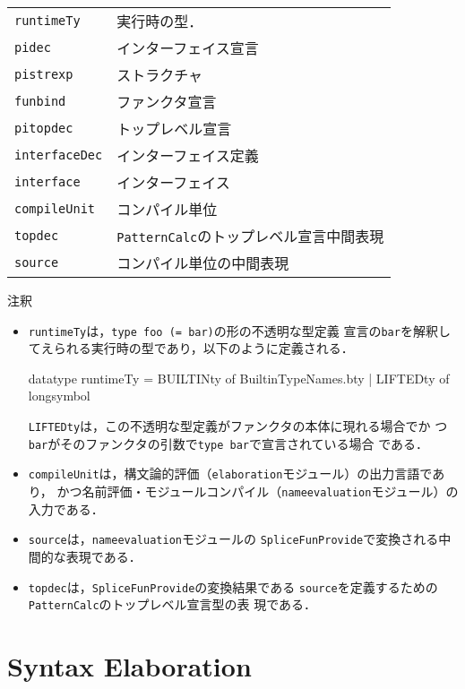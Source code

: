 \documentclass{jbook}
\newcommand{\txt}[2]{#2}
\newcommand{\code}[1]{\mbox{\large\tt #1}}
\newenvironment{programPlain}{\begin{large}\begin{tt}}%
	                     {\end{tt}\end{large}}
\begin{document}
\begin{tabular}{ll}
\code{runtimeTy} & 実行時の型．
\\
\code{pidec} & インターフェイス宣言
\\
\code{pistrexp} & ストラクチャ
\\
\code{funbind} & ファンクタ宣言
\\
\code{pitopdec} & トップレベル宣言
\\
\code{interfaceDec} & インターフェイス定義
\\
\code{interface} & インターフェイス
\\
\code{compileUnit} & コンパイル単位
\\
\code{topdec} & \code{PatternCalc}のトップレベル宣言中間表現
\\
\code{source} & コンパイル単位の中間表現
\end{tabular}

注釈
\begin{itemize}
\item \code{runtimeTy}は，\code{type foo (= bar)}の形の不透明な型定義
宣言の\code{bar}を解釈してえられる実行時の型であり，以下のように定義される．
\begin{programPlain}
datatype runtimeTy = BUILTINty of BuiltinTypeNames.bty | LIFTEDty of longsymbol
\end{programPlain}
\code{LIFTEDty}は，この不透明な型定義がファンクタの本体に現れる場合でか
つ\code{bar}がそのファンクタの引数で\code{type bar}で宣言されている場合
である．

\item \code{compileUnit}は，構文論的評価（\code{elaboration}モジュール）の出力言語であり，
かつ名前評価・モジュールコンパイル（\code{nameevaluation}モジュール）の
入力である．

\item 
	\code{source}は，\code{nameevaluation}モジュールの
\code{SpliceFunProvide}で変換される中間的な表現である．
\item \code{topdec}は，\code{SpliceFunProvide}の変換結果である
\code{source}を定義するための\code{PatternCalc}のトップレベル宣言型の表
現である．
\end{itemize}

\else%
\fi%



% 
\chapter{\txt
{構文論的解釈処理}
{Syntax Elaboration}
}
\label{chap:elaboration}
\end{document}
